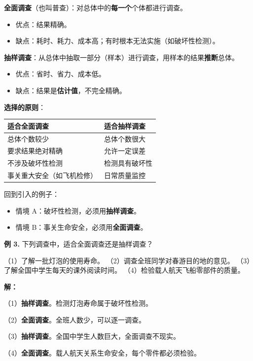 \begin{understand}


\textbf{全面调查}（也叫普查）：对总体中的\textbf{每一个}个体都进行调查。
\begin{itemize}
  \item 优点：结果精确。
  \item 缺点：耗时、耗力、成本高；有时根本无法实施（如破坏性检测）。
\end{itemize}


\textbf{抽样调查}：从总体中抽取一部分（样本）进行调查，用样本的结果\textbf{推断}总体。
\begin{itemize}
  \item 优点：省时、省力、成本低。
  \item 缺点：结果是\textbf{估计值}，不完全精确。
\end{itemize}


\textbf{选择的原则}：

\begin{center}
\begin{tabular}{ll}
\toprule
适合全面调查 & 适合抽样调查 \\
\midrule
总体个数较少 & 总体个数很大 \\
要求结果绝对精确 & 允许一定误差 \\
不涉及破坏性检测 & 检测具有破坏性 \\
事关重大安全（如飞机检修） & 日常质量监控 \\
\bottomrule
\end{tabular}
\end{center}


回到引入的例子：
\begin{itemize}
  \item 情境 A：破坏性检测，必须用\textbf{抽样调查}。
  \item 情境 B：事关生命安全，必须用\textbf{全面调查}。
\end{itemize}


\end{understand}

\begin{workedexamples}


\textbf{例 3.} 下列调查中，适合全面调查还是抽样调查？

（1）了解一批灯泡的使用寿命。
（2）调查全班同学对春游目的地的意见。
（3）了解全国中学生每天的课外阅读时间。
（4）检验载人航天飞船零部件的质量。

\textbf{解：}

（1）\textbf{抽样调查}。检测灯泡寿命属于破坏性检测。

（2）\textbf{全面调查}。全班人数少，可以逐一调查。

（3）\textbf{抽样调查}。全国中学生人数巨大，全面调查不现实。

（4）\textbf{全面调查}。载人航天关系生命安全，每个零件都必须检验。

\end{workedexamples}

